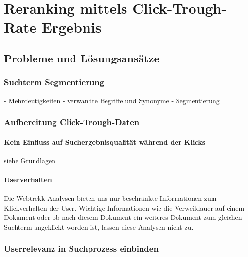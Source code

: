 %
\chapter{Reranking mittels Click-Trough-Rate Ergebnis}
\label{sec:Reranking}


\section{Probleme und Lösungsansätze}
\label{sec:Reranking:Probleme}

\subsection{Suchterm Segmentierung}
\label{sec:Reranking:Probleme:SuchtermSegmentierung}

- Mehrdeutigkeiten
- verwandte Begriffe und Synonyme
- Segmentierung

\subsection{Aufbereitung Click-Trough-Daten}
\label{sec:Reranking:Probleme:Click-Trough-Daten}

\subsubsection{Kein Einfluss auf Suchergebnisqualität während der Klicks}
\label{sec:Reranking:Probleme:Click-Trough-Daten:Click-Trough-Suchergebnisqualität}

siehe Grundlagen

\subsubsection{Userverhalten }
\label{sec:Reranking:Probleme:Click-Trough-Daten:Click-Trough-Userverhalten}

Die Webtrekk-Analysen bieten uns nur beschränkte Informationen zum Klickverhalten der User. Wichtige Informationen wie die Verweildauer auf einem Dokument oder ob nach diesem Dokument ein weiteres Dokument zum gleichen Suchterm angeklickt worden ist, lassen diese Analysen nicht zu. 

\subsection{Userrelevanz in Suchprozess einbinden}
\label{sec:Reranking:Methodik:SucheEinbinden}

